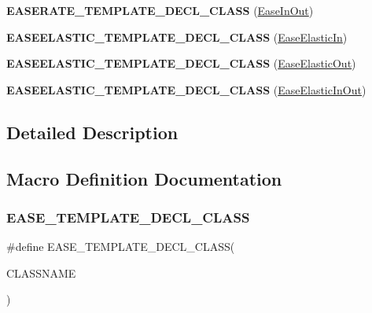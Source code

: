 \begin{DoxyCompactItemize}
{\bfseries E\+A\+S\+E\+R\+A\+T\+E\+\_\+\+T\+E\+M\+P\+L\+A\+T\+E\+\_\+\+D\+E\+C\+L\+\_\+\+C\+L\+A\+SS} (\hyperlink{classEaseInOut}{Ease\+In\+Out})
\item 
\mbox{\label{group__actions_gaedf3ca858aead55bf55720c4e26a550a}} 
{\bfseries E\+A\+S\+E\+E\+L\+A\+S\+T\+I\+C\+\_\+\+T\+E\+M\+P\+L\+A\+T\+E\+\_\+\+D\+E\+C\+L\+\_\+\+C\+L\+A\+SS} (\hyperlink{classEaseElasticIn}{Ease\+Elastic\+In})
\item 
\mbox{\label{group__actions_ga1f7e86621b679aa81330f865579e8bb8}} 
{\bfseries E\+A\+S\+E\+E\+L\+A\+S\+T\+I\+C\+\_\+\+T\+E\+M\+P\+L\+A\+T\+E\+\_\+\+D\+E\+C\+L\+\_\+\+C\+L\+A\+SS} (\hyperlink{classEaseElasticOut}{Ease\+Elastic\+Out})
\item 
\mbox{\label{group__actions_ga9540237de587dcde864da3fd9dba83ed}} 
{\bfseries E\+A\+S\+E\+E\+L\+A\+S\+T\+I\+C\+\_\+\+T\+E\+M\+P\+L\+A\+T\+E\+\_\+\+D\+E\+C\+L\+\_\+\+C\+L\+A\+SS} (\hyperlink{classEaseElasticInOut}{Ease\+Elastic\+In\+Out})
\end{DoxyCompactItemize}


\subsection{Detailed Description}


\subsection{Macro Definition Documentation}
\mbox{\label{group__actions_gae8182a9feef786ac01612b0c726dbcc6}} 
\subsubsection{\texorpdfstring{E\+A\+S\+E\+\_\+\+T\+E\+M\+P\+L\+A\+T\+E\+\_\+\+D\+E\+C\+L\+\_\+\+C\+L\+A\+SS}{EASE\_TEMPLATE\_DECL\_CLASS}}
{\footnotesize\ttfamily \#define E\+A\+S\+E\+\_\+\+T\+E\+M\+P\+L\+A\+T\+E\+\_\+\+D\+E\+C\+L\+\_\+\+C\+L\+A\+SS(\begin{DoxyParamCaption}\item[{}]{C\+L\+A\+S\+S\+N\+A\+ME }\end{DoxyParamCaption})}

